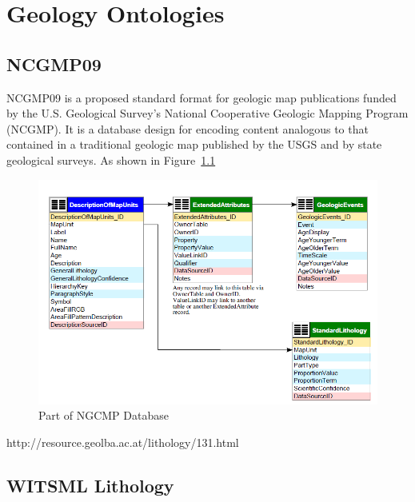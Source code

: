 \chapter{Geology Ontologies}

\section{NCGMP09}
NCGMP09 \cite{usgs2009} is a proposed standard format for geologic map publications funded by the U.S. Geological Survey's National Cooperative Geologic Mapping Program (NCGMP). It is a database design for encoding content analogous to that contained in a traditional geologic map published by the USGS and by state geological surveys. 
As shown in Figure~\ref{fig:petronto:titlepage}

\begin{figure}[htb]
  \begin{center}
    \includegraphics[width=0.9\linewidth]{ch-petro-onto/figures/mapa1}
    \caption[Sample Title Page Layout]{Part of NGCMP Database~\cite{usgs2009}}
    \label{fig:petronto:titlepage}
  \end{center}
\end{figure}
http://resource.geolba.ac.at/lithology/131.html
\section{WITSML Lithology}
\cite{energistics2012}